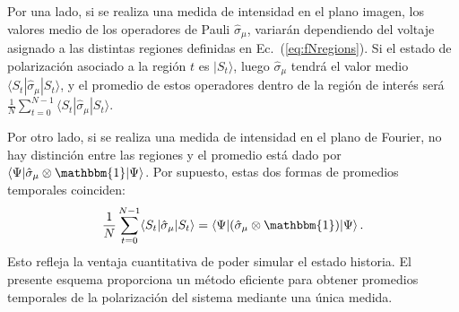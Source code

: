 Por una lado, si se realiza una medida de intensidad en el plano imagen,
los valores medio de los operadores de Pauli $\hat{\sigma}_\mu$, variarán dependiendo del voltaje asignado a las distintas regiones definidas en Ec.~(\ref{eq:fNregions}). Si el estado de polarización asociado a la región $t$ es
$|S_t\rangle$, luego $\hat{\sigma}_\mu$ tendrá el valor medio $\langle S_t|\hat{\sigma}_\mu|S_t\rangle$, y el promedio de estos operadores dentro de la región de interés será $\frac{1}{N}\sum_{t=0}^{N-1} \langle S_t|\hat{\sigma}_\mu|S_t\rangle$. 

Por otro lado, si se realiza una medida de intensidad en el plano de Fourier, 
no hay distinción entre las regiones y el promedio está dado por $\langle \Psi|\hat{\sigma}_\mu\otimes\mathbbm{1}|\Psi\rangle$. Por supuesto, estas dos formas de promedios temporales coinciden: 
\begin{equation}
    \frac{1}{N} \sum_{t=0}^{N-1} \langle S_t|\hat{\sigma}_\mu|S_t\rangle= \langle\Psi|(\hat{\sigma}_\mu\otimes\mathbbm{1})|\Psi\rangle\,. \label{prom}
\end{equation} %
Esto refleja la ventaja cuantitativa de poder simular el estado historia. El presente esquema proporciona un método eficiente para obtener promedios temporales de la polarización del sistema mediante una \'unica medida. 


